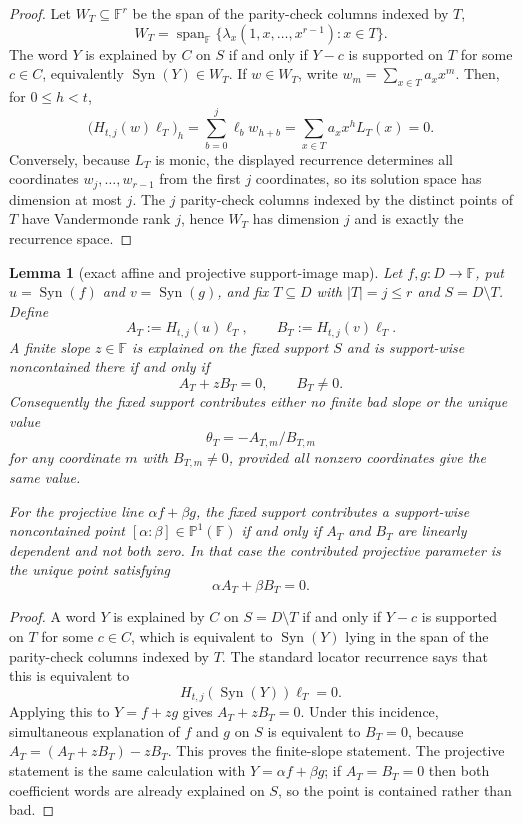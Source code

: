 \documentclass[11pt]{article}
\newtheorem{lemma}[theorem]{Lemma}
\theoremstyle{definition}
\theoremstyle{remark}
\newcommand{\F}{\mathbb{F}}
\newcommand{\Syn}{\operatorname{Syn}}
\begin{document}
\begin{proof}
Let $W_T\subseteq\F^r$ be the span of the parity-check columns indexed by $T$,
\[
        W_T=\operatorname{span}_\F\{\lambda_x(1,x,\ldots,x^{r-1}):x\in T\}.
\]
The word $Y$ is explained by $C$ on $S$ if and only if $Y-c$ is supported on $T$
for some $c\in C$, equivalently $\Syn(Y)\in W_T$.  If
$w\in W_T$, write $w_m=\sum_{x\in T}a_xx^m$.  Then, for $0\le h<t$,
\[
        \bigl(H_{t,j}(w)\boldsymbol\ell_T\bigr)_h
        =\sum_{b=0}^j\ell_b w_{h+b}
        =\sum_{x\in T}a_xx^hL_T(x)=0.
\]
Conversely, because $L_T$ is monic, the displayed recurrence determines all
coordinates $w_j,\ldots,w_{r-1}$ from the first $j$ coordinates, so its solution
space has dimension at most $j$.  The $j$ parity-check columns indexed by the
distinct points of $T$ have Vandermonde rank $j$, hence $W_T$ has dimension $j$
and is exactly the recurrence space.
\end{proof}

\begin{lemma}[exact affine and projective support-image map]
\label{lem:exact-line-image-map}
Let $f,g:D\to\F$, put $u=\Syn(f)$ and $v=\Syn(g)$, and fix
$T\subseteq D$ with $|T|=j\le r$ and $S=D\setminus T$.  Define
\[
        A_T:=H_{t,j}(u)\boldsymbol\ell_T,
        \qquad
        B_T:=H_{t,j}(v)\boldsymbol\ell_T .
\]
A finite slope $z\in\F$ is explained on the fixed support $S$ and is
support-wise noncontained there if and only if
\[
        A_T+zB_T=0,
        \qquad B_T\ne0 .
\]
Consequently the fixed support contributes either no finite bad slope or the
unique value
\[
        \theta_T=-A_{T,m}/B_{T,m}
\]
for any coordinate $m$ with $B_{T,m}\ne0$, provided all nonzero coordinates give
the same value.

For the projective line $\alpha f+\beta g$, the fixed support contributes a
support-wise noncontained point $[\alpha:\beta]\in\mathbb P^1(\F)$ if and only if
$A_T$ and $B_T$ are linearly dependent and not both zero.  In that case the
contributed projective parameter is the unique point satisfying
\[
        \alpha A_T+\beta B_T=0 .
\]
\end{lemma}

\begin{proof}
A word $Y$ is explained by $C$ on $S=D\setminus T$ if and only if
$Y-c$ is supported on $T$ for some $c\in C$, which is equivalent to
$\Syn(Y)$ lying in the span of the parity-check columns indexed by $T$.  The
standard locator recurrence says that this is equivalent to
\[
        H_{t,j}(\Syn(Y))\boldsymbol\ell_T=0 .
\]
Applying this to $Y=f+zg$ gives $A_T+zB_T=0$.  Under this incidence, simultaneous
explanation of $f$ and $g$ on $S$ is equivalent to $B_T=0$, because
$A_T=(A_T+zB_T)-zB_T$.  This proves the finite-slope statement.  The projective
statement is the same calculation with $Y=\alpha f+\beta g$; if
$A_T=B_T=0$ then both coefficient words are already explained on $S$, so the
point is contained rather than bad.
\end{proof}
\end{document}
